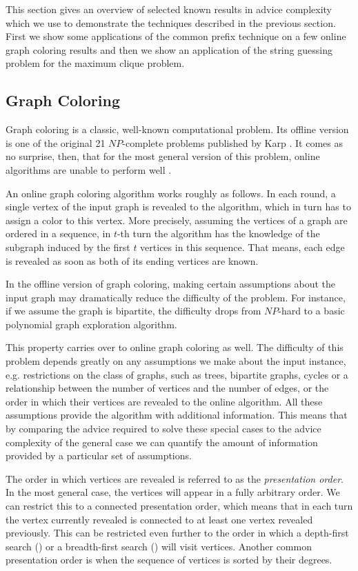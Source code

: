This section gives an overview of selected known results in advice
complexity which we use to demonstrate the techniques described in the
previous section. First we show some applications of the common prefix
technique on a few online graph coloring results and then we show an
application of the string guessing problem for the maximum clique problem.

\subsection{Graph Coloring}
Graph coloring is a classic, well-known computational problem. Its offline
version is one of the original 21 $NP$-complete problems published by Karp
\cite{karp-np}. It comes as no surprise, then, that for the most general
version of this problem, online algorithms are unable to perform well
\cite{online-graph-bound}.

An online graph coloring algorithm works roughly as follows. In each
round, a single vertex of the input graph is revealed to the algorithm,
which in turn has to assign a color to this vertex. More precisely,
assuming the vertices of a graph are ordered in a sequence, in $t$-th turn
the algorithm has the knowledge of the subgraph induced by the first $t$
vertices in this sequence. That means, each edge is revealed as soon as
both of its ending vertices are known.

In the offline version of graph coloring, making certain assumptions about
the input graph may dramatically reduce the difficulty of the problem. For
instance, if we assume the graph is bipartite, the difficulty drops from
$NP$-hard to a basic polynomial graph exploration algorithm.

This property carries over to online graph coloring as well. The
difficulty of this problem depends greatly on any assumptions we make
about the input instance, e.g. restrictions on the class of graphs, such
as trees, bipartite graphs, cycles or a relationship between the number of
vertices and the number of edges, or the order in which their vertices are
revealed to the online algorithm. All these assumptions provide the
algorithm with additional information. This means that by comparing the
advice required to solve these special cases to the advice complexity of
the general case we can quantify the amount of information provided by a
particular set of assumptions.

The order in which vertices are revealed is referred to as the
\emph{presentation order}. In the most general case, the vertices will
appear in a fully arbitrary order. We can restrict this to a connected
presentation order, which means that in each turn the vertex currently
revealed is connected to at least one vertex revealed previously. This can
be restricted even further to the order in which a depth-first search
() or a breadth-first search () will visit
vertices. Another common presentation order is when the sequence of
vertices is sorted by their degrees.

